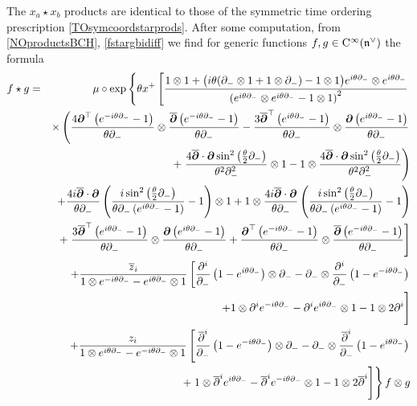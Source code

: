 The $x_a \star x_b$ products are identical to those of the symmetric time
ordering prescription \eqref{TOsymcoordstarprods}. After some computation, from
\eqref{NOproductsBCH}, \eqref{fstargbidiff} we find for generic functions
$f,g\in{\rm C}^\infty({\mathfrak n}^\vee)$ the formula
\begin{eqnarray}
\nonumber
f\star g&=&\mu\circ\exp\left\{\theta x^+ \left[  
\frac{1\otimes1+\bigl( i
\theta (\partial_-\otimes1+1\otimes\partial_-)-1\otimes1
\bigr)  e^{ i\theta \partial_-}\otimes e^{ i\theta \partial_-}}
{\left( e^{ i\theta \partial_-}\otimes e^{ i\theta \partial_-}-1\otimes1
\right)^2}\right.\right.\\ &&\times 
\left(\frac{4{{\boldsymbol {\partial} }}^\top\left( e^{- i\theta \partial_-}-1
\right)}{\theta \partial_-}\otimes
\frac{\overline{{{\boldsymbol {\partial} }}}\left( e^{- i\theta \partial_-}-1
\right)}{\theta \partial_-}-\frac{3\overline{{{\boldsymbol {\partial} }}}^{ \top}
\left( e^{ i\theta \partial_-}-1
\right)}{\theta \partial_-}\otimes
\frac{{{\boldsymbol {\partial} }}\left( e^{ i\theta \partial_-}-1
\right)}{\theta \partial_-}\right.\nonumber\\ &&+\left.
\frac{4\overline{{{\boldsymbol {\partial} }}}\cdot{{\boldsymbol {\partial} }}\sin^2\left(\frac\theta2
 \partial_-\right)}{\theta^2 \partial_-^2}\otimes1-1\otimes
\frac{4\overline{{{\boldsymbol {\partial} }}}\cdot{{\boldsymbol {\partial} }}\sin^2\left(\frac\theta2
 \partial_-\right)}{\theta^2 \partial_-^2}\right)
\nonumber\\ &&+ 
\frac{4 i\overline{{{\boldsymbol {\partial} }}}\cdot{{\boldsymbol {\partial} }}}{\theta \partial_-}
\left(\frac{ i\sin^2\left(\frac\theta2
 \partial_-\right)}{\theta \partial_-\left(
 e^{ i\theta \partial_-}-1\right)}-1\right)\otimes1+1\otimes
\frac{4 i\overline{{{\boldsymbol {\partial} }}}\cdot{{\boldsymbol {\partial} }}}{\theta \partial_-}
\left(\frac{ i\sin^2\left(\frac\theta2
 \partial_-\right)}{\theta \partial_-\left(
 e^{ i\theta \partial_-}-1\right)}-1\right)\nonumber\\ &&
+\left.\frac{3\overline{{{\boldsymbol {\partial} }}}^{ \top}\left( e^{ i\theta \partial_-}-1
\right)}{\theta \partial_-}\otimes\frac{
{{\boldsymbol {\partial} }}\left( e^{ i\theta \partial_-}-1
\right)}{\theta \partial_-}+\frac{{{\boldsymbol {\partial} }}^\top
\left( e^{- i\theta \partial_-}-1
\right)}{\theta \partial_-}\otimes\frac{\overline{{{\boldsymbol {\partial} }}}
\left( e^{- i\theta \partial_-}-1\right)}{\theta \partial_-}  \right]
\nonumber\\&&
+ \frac{\overline{z}_i}{1\otimes e^{- i\theta 
\partial_-}- e^{ i\theta \partial_-}\otimes1} \left[  
\frac{\partial^i}{\partial_-} \left(1- e^{ i\theta \partial_-}
\right)\otimes\partial_--\partial_-\otimes\frac{\partial^i}
{\partial_-} \left(1- e^{- i\theta \partial_-}\right)\right.\nonumber\\
&& +\Biggl. 1\otimes\partial^i 
 e^{- i\theta \partial_-}-\partial^i  e^{ i\theta \partial_-}
\otimes1-1\otimes2\partial^i  \Biggr]\nonumber\\ &&
+ \frac{z_i}{1\otimes e^{ i\theta 
\partial_-}- e^{- i\theta \partial_-}\otimes1} \left[  
\frac{\overline{\partial}^{ i}}{\partial_-} \left(1- e^{- i\theta \partial_-}
\right)\otimes\partial_--\partial_-\otimes\frac{\overline{\partial}^{ i}}
{\partial_-} \left(1- e^{ i\theta \partial_-}\right)\right.\nonumber\\
&& +\left.\Biggl.1\otimes\overline{\partial}^{ i} 
 e^{ i\theta \partial_-}-\overline{\partial}^{ i}  e^{- i\theta \partial_-}
 \otimes1-1\otimes2\overline{\partial}^{ i}  \Biggr]\right\}f\otimes g
  \label{Weylstargen}
\end{eqnarray}
